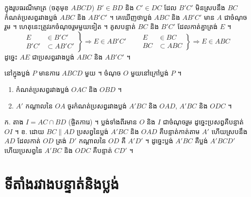 \begin{example}[លំហាត់គំរូ]
ក្នុងរូបធរណីមាត្រ (ចតុមុខ $ABCD$) $B' \in BD$ និង $C' \in DC$ ដែល $B'C'$ មិនស្របនឹង $BC$ កំណត់ប្រសព្វរវាងប្លង់ $ABC$ និង $AB'C'$ ។
\ans
គេឃើញថាប្លង់ $ABC$ និង $AB'C'$ មាន $A$ ជាចំណុចរួម ។ ហេតុនេះត្រូវរកចំណុចរួមមួយទៀត ។ គូសបន្ទាត់ $BC$ និង $B'C'$ ដែលកាត់គ្នាត្រង់ $E$ ។
\[
\left.\begin{aligned} E &\in B'C'\\ B'C' &\subset AB'C' \end{aligned}\right\} \Rightarrow E \in AB'C'
\qquad
\left.\begin{aligned} E &\in BC\\ BC &\subset ABC \end{aligned}\right\} \Rightarrow E \in ABC
\]
ដូច្នេះ $AE$ ជាប្រសព្វរវាងប្លង់ $ABC$ និង $AB'C'$ ។
\begin{center}
\end{center}
\end{example}

\begin{pro}
នៅក្នុងប្លង់ $P$ មានការេ $ABCD$ មួយ ។ ចំណុច $O$ មួយនៅក្រៅប្លង់ $P$ ។
\begin{enumerate}[a]
  \item កំណត់ប្រសព្វរវាងប្លង់ $OAC$ និង $OBD$ ។
  \item $A'$ កណ្ដាលនៃ $OA$ ចូរកំណត់ប្រសព្វរវាងប្លង់ $A'BC$ និង $OAD$, $A'BC$ និង $ODC$ ។
\end{enumerate}
\ans
ក. តាង $I = AC \cap BD$ (ផ្ចិតការេ) ។ ប្លង់ទាំងពីរមាន $O$ និង $I$ ជាចំណុចរួម ដូច្នេះប្រសព្វគឺបន្ទាត់ $OI$ ។ \quad ខ. ដោយ $BC \parallel AD$ ប្រសព្វនៃប្លង់ $A'BC$ និង $OAD$ គឺបន្ទាត់កាត់តាម $A'$ ហើយស្របនឹង $AD$ ដែលកាត់ $OD$ ត្រង់ $D'$ កណ្ដាលនៃ $OD$ គឺ $A'D'$ ។ ដូច្នេះប្លង់ $A'BC$ គឺប្លង់ $A'BCD'$ ហើយប្រសព្វនៃ $A'BC$ និង $ODC$ គឺបន្ទាត់ $CD'$ ។
\end{pro}

\section{ទីតាំងរវាងបន្ទាត់និងប្លង់}

